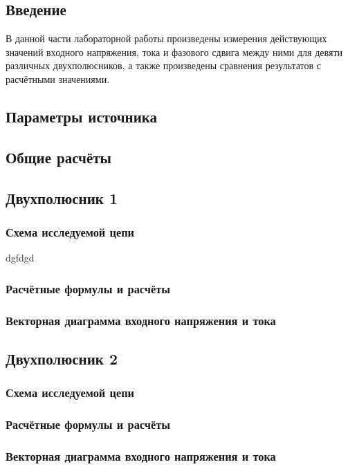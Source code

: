 \subsection{Введение}
В данной части лабораторной работы произведены измерения действующих значений входного напряжения, тока и фазового сдвига между ними для девяти различных двухполюсников, а также произведены сравнения результатов с расчётными значениями.

\subsection{Параметры источника}

\subsection{Общие расчёты}


\subsection{Двухполюсник 1}
\subsubsection{Схема исследуемой цепи}
dgfdgd
\subsubsection{Расчётные формулы и расчёты}
\subsubsection{Векторная диаграмма входного напряжения и тока}

\subsection{Двухполюсник 2}
\subsubsection{Схема исследуемой цепи}
\subsubsection{Расчётные формулы и расчёты}
\subsubsection{Векторная диаграмма входного напряжения и тока}

